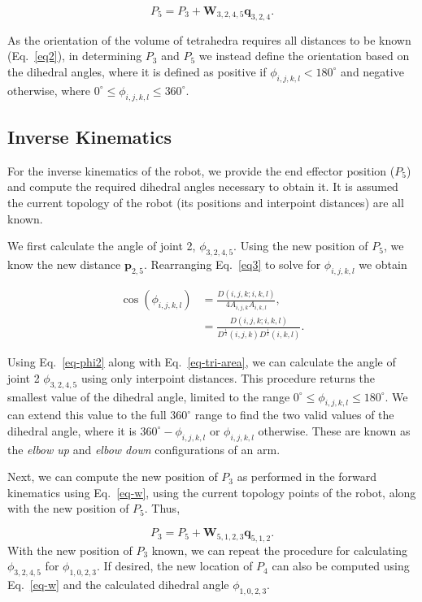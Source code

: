 \begin{equation}
    P_5 = P_3+\textbf{W}_{3,2,4,5}\textbf{q}_{3,2,4}.
    \label{eq-p5}
\end{equation}

As the orientation of the volume of tetrahedra requires all distances to be known (Eq.~\ref{eq2}), in determining $P_3$ and $P_5$ we instead define the orientation based on the dihedral angles, where it is defined as positive if $\phi_{i,j,k,l}<180^{\circ}$ and negative otherwise, where $0^{\circ}\leq\phi_{i,j,k,l}\leq360^{\circ}$.

\subsection{Inverse Kinematics}
For the inverse kinematics of the robot, we provide the end effector position ($P_5$) and compute the required dihedral angles necessary to obtain it. It is assumed the current topology of the robot (its positions and interpoint distances) are all known.

We first calculate the angle of joint 2, $\phi_{3,2,4,5}$. Using the new position of $P_5$, we know the new distance $\textbf{p}_{2,5}$. Rearranging Eq.~\ref{eq3} to solve for $\phi_{i,j,k,l}$ we obtain

\begin{align}
    \cos{(\phi_{i,j,k,l})}&=\frac{D(i,j,k;i,k,l)}{4A_{i,j,k}A_{i,k,l}},
    \nonumber \\
    &=\frac{D(i,j,k;i,k,l)}{D^\frac{1}{2}(i,j,k)D^\frac{1}{2}(i,k,l)}.
    \label{eq-phi2}
\end{align}

Using Eq.~\ref{eq-phi2} along with Eq.~\ref{eq-tri-area}, we can calculate the angle of joint 2 $\phi_{3,2,4,5}$ using only interpoint distances. This procedure returns the smallest value of the dihedral angle, limited to the range $0^{\circ}\leq\phi_{i,j,k,l}\leq180^{\circ}$. We can extend this value to the full $360^{\circ}$ range to find the two valid values of the dihedral angle, where it is $360^{\circ}-\phi_{i,j,k,l}$ or $\phi_{i,j,k,l}$ otherwise. These are known as the \textit{elbow up} and \textit{elbow down} configurations of an arm.

Next, we can compute the new position of $P_3$ as performed in the forward kinematics using Eq.~\ref{eq-w}, using the current topology points of the robot, along with the new position of $P_5$. Thus,

\begin{equation}
    P_3 = P_5+\textbf{W}_{5,1,2,3}\textbf{q}_{5,1,2}.
    \label{eq-ik-p3}
\end{equation}
With the new position of $P_3$ known, we can repeat the procedure for calculating $\phi_{3,2,4,5}$ for $\phi_{1,0,2,3}$. If desired, the new location of $P_4$ can also be computed using Eq.~\ref{eq-w} and the calculated dihedral angle $\phi_{1,0,2,3}$.


